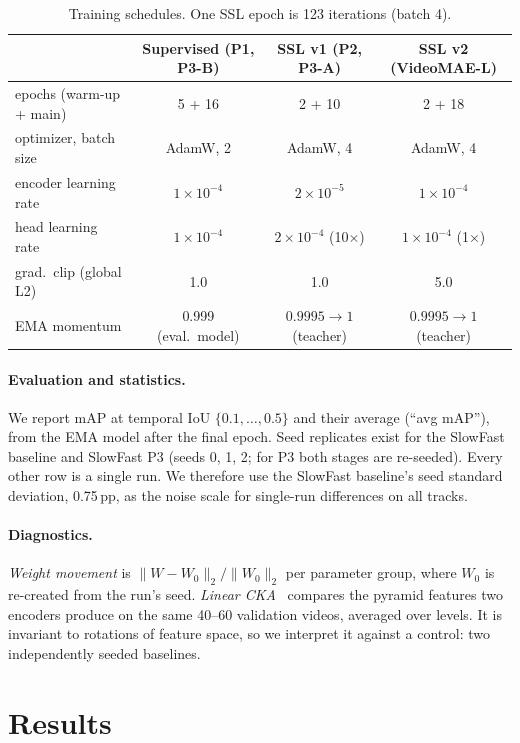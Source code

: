\documentclass[10pt,a4paper]{article}
\newcommand{\pp}{\,pp}
\begin{document}
\begin{table}[t]
\centering\small
\caption{Training schedules. One SSL epoch is 123 iterations (batch 4).}
\label{tab:hparams}
\begin{tabular}{lccc}
\toprule
 & Supervised (P1, P3-B) & SSL v1 (P2, P3-A) & SSL v2 (VideoMAE-L) \\
\midrule
epochs (warm-up + main) & 5 + 16 & 2 + 10 & 2 + 18 \\
optimizer, batch size & AdamW, 2 & AdamW, 4 & AdamW, 4 \\
encoder learning rate & $1{\times}10^{-4}$ & $2{\times}10^{-5}$ & $1{\times}10^{-4}$ \\
head learning rate & $1{\times}10^{-4}$ & $2{\times}10^{-4}$ (10$\times$) & $1{\times}10^{-4}$ (1$\times$) \\
grad.\ clip (global L2) & 1.0 & 1.0 & 5.0 \\
EMA momentum & 0.999 (eval.\ model) & $0.9995\rightarrow1$ (teacher) & $0.9995\rightarrow1$ (teacher) \\
\bottomrule
\end{tabular}
\end{table}

\paragraph{Evaluation and statistics.} We report mAP at temporal IoU
$\{0.1,\dots,0.5\}$ and their average (``avg mAP''), from the EMA model after the final
epoch. Seed replicates exist for the SlowFast baseline and SlowFast P3 (seeds 0, 1, 2;
for P3 both stages are re-seeded). Every other row is a single run. We therefore use the
SlowFast baseline's seed standard deviation, 0.75\pp, as the noise scale for single-run
differences on all tracks.

\paragraph{Diagnostics.} \emph{Weight movement} is
$\|W-W_0\|_2/\|W_0\|_2$ per parameter group, where $W_0$ is re-created from the run's seed.
\emph{Linear CKA}~\cite{kornblith2019cka} compares the pyramid features two encoders
produce on the same 40--60 validation videos, averaged over levels. It is invariant to
rotations of feature space, so we interpret it against a control: two independently seeded
baselines.

\section{Results}\label{sec:results}
\end{document}
